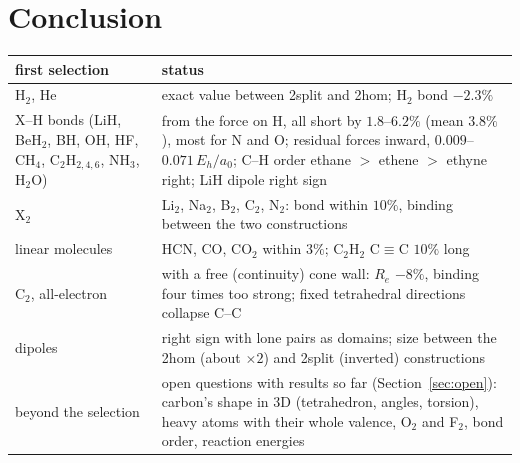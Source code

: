 \documentclass[11pt]{article}
\begin{document}


\section{Conclusion}
\label{sec:conclusion}

\begin{center}
\small
\begin{tabular}{p{}p{}}
\toprule
first selection & status \\
\midrule
H$_2$, He & exact value between 2split and 2hom; H$_2$ bond $-2.3\%$ \\
X--H bonds (LiH, BeH$_2$, BH, OH, HF, CH$_4$, C$_2$H$_{2,4,6}$, NH$_3$, H$_2$O) & from the force on H, all short by
  $1.8$--$6.2\%$ (mean $3.8\%$), most for N and O; residual forces inward, $0.009$--$0.071\,E_h/a_0$; C--H order
  ethane $>$ ethene $>$ ethyne right; LiH dipole right sign \\
X$_2$ & Li$_2$, Na$_2$, B$_2$, C$_2$, N$_2$: bond within $10\%$, binding between the two constructions \\
linear molecules & HCN, CO, CO$_2$ within $3\%$; C$_2$H$_2$ C$\equiv$C $10\%$ long \\
C$_2$, all-electron & with a free (continuity) cone wall: $R_e$ $-8\%$, binding four times too strong;
  fixed tetrahedral directions collapse C--C \\
dipoles & right sign with lone pairs as domains; size between the 2hom (about $\times2$) and 2split (inverted)
  constructions \\
\midrule
beyond the selection & open questions with results so far (Section~\ref{sec:open}): carbon's shape in 3D
  (tetrahedron, angles, torsion), heavy atoms with their whole valence, O$_2$ and F$_2$, bond order,
  reaction energies \\
\bottomrule
\end{tabular}
\end{center}
\end{document}
